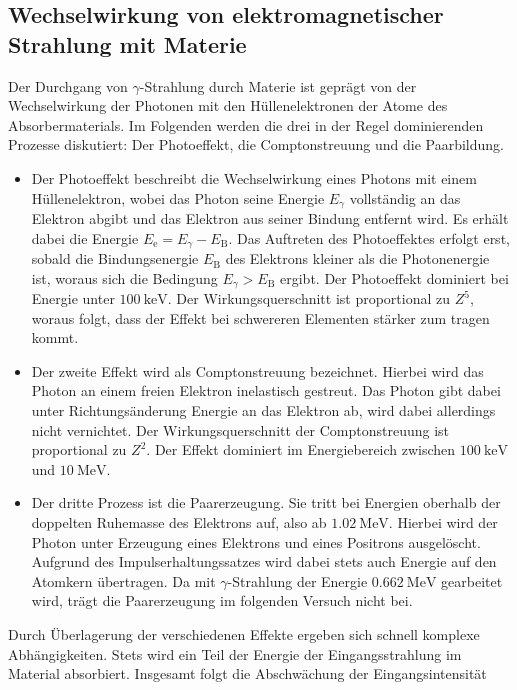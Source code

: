 \subsection{Wechselwirkung von elektromagnetischer Strahlung mit Materie}
Der Durchgang von $\gamma$-Strahlung durch Materie ist geprägt von der
Wechselwirkung der Photonen mit den Hüllenelektronen der Atome des
Absorbermaterials. Im Folgenden werden die drei in der Regel dominierenden
Prozesse diskutiert: Der Photoeffekt, die Comptonstreuung und die Paarbildung.
\begin{itemize}
  \item Der Photoeffekt beschreibt die Wechselwirkung eines Photons mit einem
  Hüllenelektron, wobei das Photon seine Energie $E_{\gamma}$ vollständig an
  das Elektron abgibt und das Elektron aus seiner Bindung  entfernt wird. Es
  erhält dabei die Energie $E_\text{e}=E_{\gamma}-E_\text{B}$. Das Auftreten
  des Photoeffektes erfolgt erst, sobald die Bindungsenergie $E_\text{B}$ des
  Elektrons kleiner als die Photonenergie ist, woraus sich die Bedingung
  $E_{\gamma}>E_\text{B}$ ergibt. Der Photoeffekt dominiert bei Energie unter
  $\SI{100}{\kilo\electronvolt}$. Der Wirkungsquerschnitt ist proportional zu
  $Z^5$, woraus folgt, dass der Effekt bei schwereren Elementen stärker zum 
  tragen kommt.
  \item Der zweite Effekt wird als Comptonstreuung bezeichnet. Hierbei wird das
  Photon an einem freien Elektron inelastisch gestreut. Das Photon gibt dabei
  unter Richtungsänderung Energie an das Elektron ab, wird dabei allerdings
  nicht vernichtet. Der Wirkungsquerschnitt der Comptonstreuung ist
  proportional zu $Z^2$. Der Effekt dominiert im Energiebereich zwischen
  $\SI{100}{\kilo\electronvolt}$ und $\SI{10}{\mega\electronvolt}$.
  \item Der dritte Prozess ist die Paarerzeugung. Sie tritt bei Energien
  oberhalb der doppelten Ruhemasse des Elektrons auf, also ab
  $\SI{1.02}{\mega\electronvolt}$. Hierbei wird der Photon unter Erzeugung eines
  Elektrons und eines Positrons ausgelöscht. Aufgrund des
  Impulserhaltungssatzes wird dabei stets auch Energie auf den Atomkern
  übertragen. Da mit $\gamma$-Strahlung der Energie
  $\SI{0.662}{\mega\electronvolt}$ gearbeitet wird, trägt die Paarerzeugung im
  folgenden Versuch nicht bei.
\end{itemize}
Durch Überlagerung der verschiedenen Effekte ergeben sich schnell komplexe
Abhängigkeiten. Stets wird ein Teil der Energie der Eingangsstrahlung im
Material absorbiert. Insgesamt folgt die Abschwächung der Eingangsintensität
